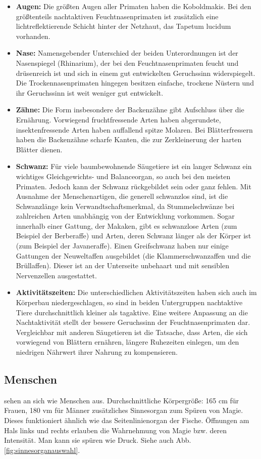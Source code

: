 \begin{itemize}
	\item \textbf{Augen:} Die größten Augen aller Primaten haben die Koboldmakis. Bei den größtenteils nachtaktiven Feuchtnasenprimaten ist zusätzlich eine lichtreflektierende Schicht hinter der Netzhaut, das Tapetum lucidum vorhanden.
	\item \textbf{Nase:} Namensgebender Unterschied der beiden Unterordnungen ist der Nasenspiegel (Rhinarium), der bei den Feuchtnasenprimaten feucht und drüsenreich ist und sich in einem gut entwickelten Geruchssinn widerspiegelt. Die Trockennasenprimaten hingegen besitzen einfache, trockene Nüstern und ihr Geruchssinn ist weit weniger gut entwickelt. 
	\item \textbf{Zähne:} Die Form insbesondere der Backenzähne gibt Aufschluss über die Ernährung. Vorwiegend fruchtfressende Arten haben abgerundete, insektenfressende Arten haben auffallend spitze Molaren. Bei Blätterfressern haben die Backenzähne scharfe Kanten, die zur Zerkleinerung der harten Blätter dienen. 
	\item \textbf{Schwanz:} Für viele baumbewohnende Säugetiere ist ein langer Schwanz ein wichtiges Gleichgewichts- und Balanceorgan, so auch bei den meisten Primaten. Jedoch kann der Schwanz rückgebildet sein oder ganz fehlen. Mit Ausnahme der Menschenartigen, die generell schwanzlos sind, ist die Schwanzlänge kein Verwandtschaftsmerkmal, da Stummelschwänze bei zahlreichen Arten unabhängig von der Entwicklung vorkommen. Sogar innerhalb einer Gattung, der Makaken, gibt es schwanzlose Arten (zum Beispiel der Berberaffe) und Arten, deren Schwanz länger als der Körper ist (zum Beispiel der Javaneraffe). Einen Greifschwanz haben nur einige Gattungen der Neuweltaffen ausgebildet (die Klammerschwanzaffen und die Brüllaffen). Dieser ist an der Unterseite unbehaart und mit sensiblen Nervenzellen ausgestattet.
	\item \textbf{Aktivitätszeiten:} Die unterschiedlichen Aktivitätszeiten haben sich auch im Körperbau niedergeschlagen, so sind in beiden Untergruppen nachtaktive Tiere durchschnittlich kleiner als tagaktive. Eine weitere Anpassung an die Nachtaktivität stellt der bessere Geruchssinn der Feuchtnasenprimaten dar. Vergleichbar mit anderen Säugetieren ist die Tatsache, dass Arten, die sich vorwiegend von Blättern ernähren, längere Ruhezeiten einlegen, um den niedrigen Nährwert ihrer Nahrung zu kompensieren. 
\end{itemize}


\subsection{Menschen} \label{rasse:mensch}
\begin{outline}
	\1 sehen an sich wie Menschen aus. Durchschnittliche Körpergröße: 165 cm für Frauen, 180 vm für Männer
	\1 zusätzliches Sinnesorgan zum Spüren von Magie. 
	Dieses funktioniert ähnlich wie das Seitenlinienorgan der Fische. Öffnungen am Hals links und rechts erlauben die Wahrnehmung von Magie bzw. deren Intensität. 
	Man kann sie spüren wie Druck. Siehe auch Abb. \ref{fig:sinnesorganauswahl}.
\end{outline}

